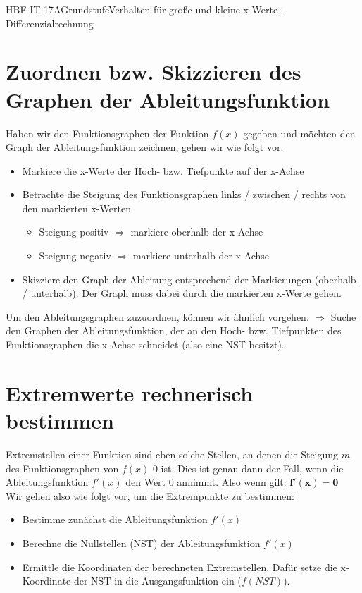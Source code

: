 \documentclass[11pt,twocolumn,oneside,openany,headings=optiontotoc,11pt,numbers=noenddot]{article}
\begin{document}
\begin{worksheet}{HBF IT 17A}{Grundstufe}{Verhalten für große und kleine x-Werte | Differenzialrechnung}
		\section{Zuordnen bzw. Skizzieren des Graphen der Ableitungsfunktion}
		Haben wir den Funktionsgraphen der Funktion \(f(x)\) gegeben und möchten den Graph der Ableitungsfunktion zeichnen, gehen wir wie folgt vor:\\
		\begin{itemize}
			\item Markiere die x-Werte der Hoch- bzw. Tiefpunkte auf der x-Achse
			\item Betrachte die Steigung des Funktionsgraphen links / zwischen / rechts von den markierten x-Werten
			\begin{itemize}
				\item Steigung positiv \(\Rightarrow\) markiere oberhalb der x-Achse
				\item Steigung negativ \(\Rightarrow\) markiere unterhalb der x-Achse
			\end{itemize}
			\item Skizziere den Graph der Ableitung entsprechend der Markierungen (oberhalb / unterhalb). Der Graph muss dabei durch die markierten x-Werte gehen.
		\end{itemize}
		Um den Ableitungsgraphen zuzuordnen, können wir ähnlich vorgehen. \(\Rightarrow\) Suche den Graphen der Ableitungsfunktion, der an den Hoch- bzw. Tiefpunkten des Funktionsgraphen die x-Achse schneidet (also eine NST besitzt).
		\section{Extremwerte rechnerisch bestimmen}
		Extremstellen einer Funktion sind eben solche Stellen, an denen die Steigung \(m\) des Funktionsgraphen von \(f(x)\) 0 ist. Dies ist genau dann der Fall, wenn die Ableitungsfunktion \(f'(x)\) den Wert 0 annimmt. Also wenn gilt: \(\mathbf{f'(x) = 0}\)\\
		Wir gehen also wie folgt vor, um die Extrempunkte zu bestimmen:
		\begin{itemize}
			\item Bestimme zunächst die Ableitungsfunktion \(f'(x)\)
			\item Berechne die Nullstellen (NST) der Ableitungsfunktion \(f'(x)\)
			\item Ermittle die Koordinaten der berechneten Extremstellen. Dafür setze die x-Koordinate der NST in die Ausgangsfunktion ein (\(f(NST)\)).
		\end{itemize}	
	\end{worksheet}
\end{document}

